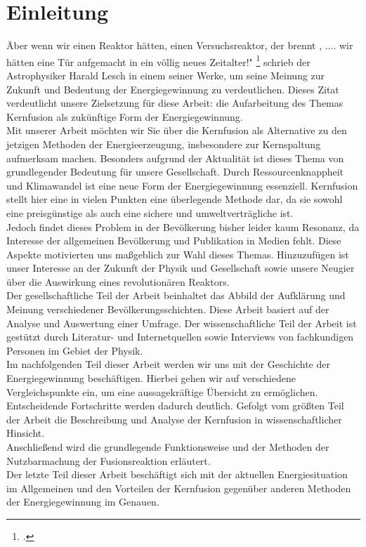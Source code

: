\section{Einleitung}
\" Aber wenn wir einen Reaktor hätten, einen Versuchsreaktor, der brennt , .... wir hätten eine Tür aufgemacht in ein völlig neues Zeitalter!" \footcite{LeschH} schrieb der Astrophysiker Harald Lesch in einem seiner Werke, um seine Meinung zur Zukunft und Bedeutung der Energiegewinnung zu verdeutlichen. Dieses Zitat verdeutlicht unsere Zielsetzung für diese Arbeit: die Aufarbeitung des Themas Kernfusion als zukünftige Form der Energiegewinnung.\\
Mit unserer Arbeit möchten wir Sie über die Kernfusion als Alternative zu den jetzigen Methoden der Energieerzeugung, insbesondere zur Kernspaltung aufmerksam machen. Besonders aufgrund der Aktualität ist dieses Thema von grundlegender Bedeutung für unsere Gesellschaft. Durch Ressourcenknappheit und Klimawandel ist eine neue Form der Energiegewinnung essenziell. Kernfusion stellt hier eine in vielen Punkten eine überlegende Methode dar, da sie sowohl eine preisgünstige als auch eine sichere und umweltverträgliche ist. \\
Jedoch findet dieses Problem in der Bevölkerung bisher leider kaum Resonanz, da Interesse der allgemeinen Bevölkerung und Publikation in Medien fehlt. Diese Aspekte motivierten uns maßgeblich zur Wahl dieses Themas. Hinzuzufügen ist unser Interesse an der Zukunft der Physik und Gesellschaft sowie unsere Neugier über die Auswirkung eines revolutionären Reaktors.\\ 
Der gesellschaftliche Teil der Arbeit beinhaltet das Abbild der Aufklärung und Meinung verschiedener Bevölkerungsschichten. Diese Arbeit basiert auf der Analyse und Auswertung einer Umfrage. Der wissenschaftliche Teil der Arbeit ist gestützt durch Literatur- und Internetquellen sowie Interviews von fachkundigen Personen im Gebiet der Physik.\\
Im nachfolgenden Teil dieser Arbeit werden wir uns mit der Geschichte der Energiegewinnung beschäftigen. Hierbei gehen wir auf verschiedene Vergleichspunkte ein, um eine aussagekräftige Übersicht zu ermöglichen. Entscheidende Fortschritte werden dadurch deutlich. Gefolgt vom größten Teil der Arbeit die Beschreibung und Analyse der Kernfusion in wissenschaftlicher Hinsicht.\\
Anschließend wird die grundlegende Funktionsweise und der Methoden der Nutzbarmachung der Fusionsreaktion erläutert.\\
Der letzte Teil dieser Arbeit beschäftigt sich mit der aktuellen Energiesituation im Allgemeinen und den Vorteilen der Kernfusion gegenüber anderen Methoden der Energiegewinnung im Genauen.\\
